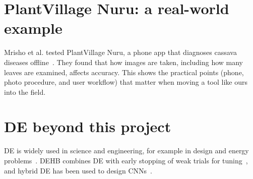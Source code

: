 \section{PlantVillage Nuru: a real-world example}
Mrisho et al. tested PlantVillage Nuru, a phone app that diagnoses cassava diseases offline~\cite{mrisho2020nuru}. They found that how images are taken, including how many leaves are examined, affects accuracy. This shows the practical points (phone, photo procedure, and user workflow) that matter when moving a tool like ours into the field.

\section{DE beyond this project}
DE is widely used in science and engineering, for example in design and energy problems~\cite{das2011survey,das2016recent}. DEHB combines DE with early stopping of weak trials for tuning~\cite{awad2021dehb}, and hybrid DE has been used to design CNNs~\cite{wang2018dearchitecture}.
